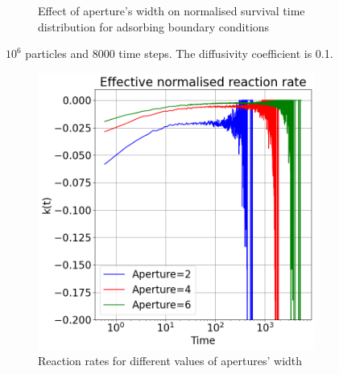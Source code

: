 \documentclass{article}
\begin{document}
\begin{figure}[htbp]
\begin{subfigure}[b]{0.45\textwidth}
        \caption{Effect of aperture's width on normalised survival time distribution for adsorbing boundary conditions}
    \end{subfigure}
    \caption{$10^6$ particles and 8000 time steps. The diffusivity coefficient is 0.1.}
    \label{fig:survTimeape}
\end{figure}

\begin{figure}[htbp]
    \centering
    \begin{subfigure}[b]{0.45\textwidth}
        \centering
        \includegraphics[width=\textwidth]{images/compareAdsRatesApe.png}
        \caption{Reaction rates for different values of apertures' width}
    \end{subfigure}
    \hfill
    \begin{subfigure}[b]{0.45\textwidth}
        \centering

\end{subfigure}
\end{figure}
\end{document}
